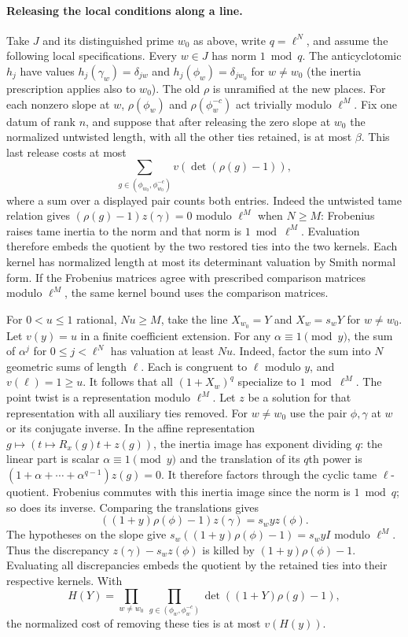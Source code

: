 \paragraph{Releasing the local conditions along a line.}
Take $J$ and its distinguished prime $w_0$ as above, write $q=\ell^N$, and
assume the following local specifications. Every $w\in J$ has norm $1\bmod q$.
The anticyclotomic $h_j$ have values $h_j(\gamma_w)=\delta_{jw}$ and
$h_j(\phi_w)=\delta_{jw_0}$ for $w\ne w_0$ (the inertia prescription applies
also to $w_0$). The old $\rho$ is unramified at the new places.
For each nonzero slope at $w$, $\rho(\phi_w)$ and
$\rho(\phi_w^{-c})$ act trivially modulo $\ell^M$.
Fix one datum of rank $n$, and suppose that after releasing the zero slope
at $w_0$ the normalized untwisted length, with all the other ties retained,
is at most $\beta$. This last release costs at most
\[
 \sum_{g\in(\phi_{w_0},\phi_{w_0}^{-c})}v(\det(\rho(g)-1)),
\]
where a sum over a displayed pair counts both entries. Indeed the untwisted
tame relation gives $(\rho(g)-1)z(\gamma)=0$ modulo $\ell^M$ when $N\geq M$:
Frobenius raises tame inertia to the norm and that norm is $1\bmod\ell^M$.
Evaluation therefore embeds the quotient by the two restored ties into the
two kernels. Each kernel has normalized length at most its determinant
valuation by Smith normal form. If the Frobenius matrices agree with
prescribed comparison matrices modulo $\ell^M$, the same kernel bound
uses the comparison matrices.

For $0<u\leq1$ rational, $Nu\geq M$, take the line
$X_{w_0}=Y$ and $X_w=s_wY$ for $w\ne w_0$. Let $v(y)=u$ in a finite
coefficient extension. For any $\alpha\equiv1\pmod y$, the sum of
$\alpha^j$ for $0\leq j<\ell^N$ has valuation at least $Nu$.
Indeed, factor the sum into $N$ geometric sums of length $\ell$.
Each is congruent to $\ell$ modulo $y$, and $v(\ell)=1\geq u$.
It follows that all $(1+X_w)^q$ specialize to $1\bmod\ell^M$.
The point twist is a representation modulo $\ell^M$. Let $z$ be a solution
for that representation with all auxiliary ties removed. For
$w\ne w_0$ use the pair $\phi,\gamma$ at $w$ or its conjugate inverse.
In the affine representation $g\mapsto(t\mapsto R_x(g)t+z(g))$,
the inertia image has exponent dividing $q$: the linear part is scalar
$\alpha\equiv1\pmod y$ and the translation of its $q$th power is
$(1+\alpha+\cdots+\alpha^{q-1})z(g)=0$. It therefore factors through
the cyclic tame $\ell$-quotient. Frobenius commutes with this inertia
image since the norm is $1\bmod q$; so does its inverse. Comparing the
translations gives
\[
 ((1+y)\rho(\phi)-1)z(\gamma)=s_w y z(\phi).
\]
The hypotheses on the slope give
$s_w((1+y)\rho(\phi)-1)=s_w y I$ modulo $\ell^M$.
Thus the discrepancy $z(\gamma)-s_w z(\phi)$ is killed by
$(1+y)\rho(\phi)-1$. Evaluating all discrepancies embeds the quotient by
the retained ties into their respective kernels. With
\[
 H(Y)=\prod_{w\ne w_0}\,
       \prod_{g\in(\phi_w,\phi_w^{-c})}\det((1+Y)\rho(g)-1),
\]
the normalized cost of removing these ties is at most $v(H(y))$.

